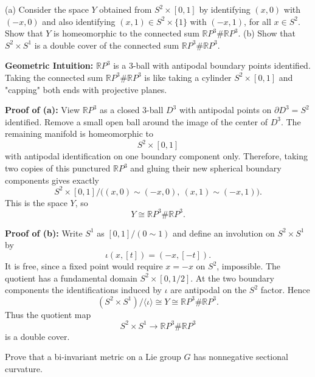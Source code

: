 \begin{exercise}
\label{geometry:2014:9}
(a) Consider the space $Y$ obtained from $S^{2} \times [0, 1]$ by identifying $(x, 0)$ with $(-x, 0)$ and also identifying $(x, 1) \in S^{2} \times \{1\}$ with $(-x, 1)$, for all $x \in S^{2}$. Show that $Y$ is homeomorphic to the connected sum $\mathbb{R}P^{3} \# \mathbb{R}P^{3}$.
(b) Show that $S^{2} \times S^{1}$ is a double cover of the connected sum $\mathbb{R}P^{3} \# \mathbb{R}P^{3}$.
\end{exercise}

\begin{solution}
\textbf{Geometric Intuition:} $\mathbb{R}P^3$ is a 3-ball with antipodal boundary points identified. Taking the connected sum $\mathbb{R}P^3 \# \mathbb{R}P^3$ is like taking a cylinder $S^2 \times [0, 1]$ and "capping" both ends with projective planes.

\textbf{Proof of (a):}
View $\mathbb{R}P^3$ as a closed $3$-ball $D^3$ with antipodal points on $\partial D^3=S^2$ identified. Remove a small open ball around the image of the center of $D^3$. The remaining manifold is homeomorphic to
\[
S^2\times [0,1]
\]
with antipodal identification on one boundary component only. Therefore, taking two copies of this punctured $\mathbb{R}P^3$ and gluing their new spherical boundary components gives exactly
\[
S^2\times[0,1]/\bigl((x,0)\sim(-x,0),\ (x,1)\sim(-x,1)\bigr).
\]
This is the space $Y$, so
\[
Y\cong \mathbb{R}P^3\#\mathbb{R}P^3.
\]

\textbf{Proof of (b):}
Write $S^1$ as $[0,1]/(0\sim 1)$ and define an involution on $S^2\times S^1$ by
\[
\iota(x,[t])=(-x,[-t]).
\]
It is free, since a fixed point would require $x=-x$ on $S^2$, impossible. The quotient has a fundamental domain $S^2\times[0,1/2]$. At the two boundary components the identifications induced by $\iota$ are antipodal on the $S^2$ factor. Hence
\[
(S^2\times S^1)/\langle\iota\rangle
\cong
Y
\cong
\mathbb{R}P^3\#\mathbb{R}P^3.
\]
Thus the quotient map
\[
S^2\times S^1\to \mathbb{R}P^3\#\mathbb{R}P^3
\]
is a double cover.
\end{solution}

\begin{exercise}
\label{geometry:2014:10}
Prove that a bi-invariant metric on a Lie group $G$ has nonnegative sectional curvature.
\end{exercise}

